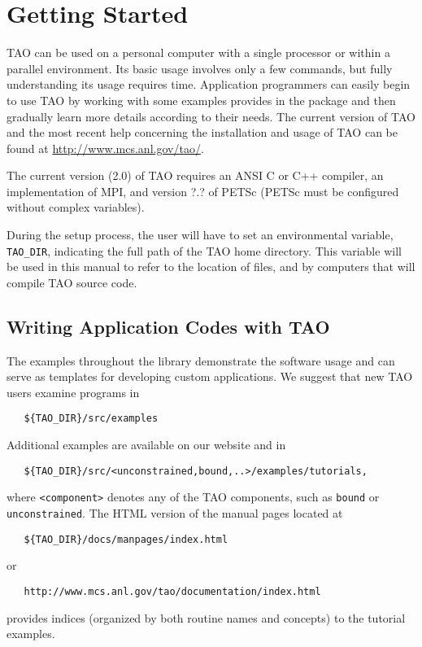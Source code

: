 \chapter{Getting Started}
\label{chapter:intro_tao}

TAO can be used on a personal
computer with a single processor or within a parallel environment.  
Its basic usage involves only a few commands, but fully 
understanding its usage requires time.
Application programmers can easily begin to use TAO by working with 
some examples provides in the package
and then gradually learn more details according to
their needs.  The current version of TAO and the most recent help 
concerning the installation and usage of TAO can be found at  
\url{http://www.mcs.anl.gov/tao/}.

The current version (2.0) of TAO requires an ANSI C or C++ compiler, 
an implementation of MPI, and version ?.? of PETSc (PETSc must be 
configured without complex variables).

During the setup process, the user will have to set an environmental
variable, \texttt{TAO\_DIR}, indicating the full path of 
the TAO home directory.
This variable will be used in this
manual to refer to the location of files, and by computers that
will compile TAO source code.

\section{Writing Application Codes with TAO}

The examples throughout the library demonstrate the software usage and
can serve as templates for developing custom applications.  We suggest
that new TAO users examine programs in
\begin{verbatim}
   ${TAO_DIR}/src/examples
\end{verbatim} %
\noindent
Additional examples are available on our website and in
\begin{verbatim}
   ${TAO_DIR}/src/<unconstrained,bound,..>/examples/tutorials,
\end{verbatim} 
\noindent
where \texttt{<component>}
denotes any of the TAO components, such as 
\texttt{bound} or \texttt{unconstrained}.
The HTML version of the manual pages located at
\begin{verbatim}
   ${TAO_DIR}/docs/manpages/index.html
\end{verbatim} %
\noindent
or
\begin{verbatim}
   http://www.mcs.anl.gov/tao/documentation/index.html
\end{verbatim}
\noindent
provides indices (organized by both routine names and concepts) to the
tutorial examples.


